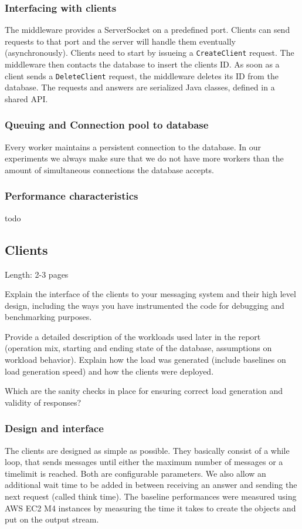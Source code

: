 \documentclass[11pt]{article}
\begin{document}
\subsubsection{Interfacing with clients}\label{sec:interfacing-with-clients}
The middleware provides a ServerSocket on a predefined port. Clients can send requests to that port and the server will handle them eventually (asynchronously).
Clients need to start by issueing a \texttt{CreateClient} request. The middleware then contacts the database to insert the clients ID. As soon as a client sends a \texttt{DeleteClient} request, the middleware deletes its ID from the database.
The requests and answers are serialized Java classes, defined in a shared API.

\subsubsection{Queuing and Connection pool to database}\label{sec:queuing-and-connection-pool-to-database}
Every worker maintains a persistent connection to the database. In our experiments we always make sure that we do not have more workers than the amount of simultaneous connections the database accepts.
\subsubsection{Performance characteristics}\label{sec:performance-characteristics-1}
todo

\subsection{Clients}\label{sec:clients}

Length: 2-3 pages

Explain the interface of the clients to your messaging system and their
high level design, including the ways you have instrumented the code for
debugging and benchmarking purposes.

Provide a detailed description of the workloads used later in the report
(operation mix, starting and ending state of the database, assumptions
on workload behavior). Explain how the load was generated (include
baselines on load generation speed) and how the clients were deployed.

Which are the sanity checks in place for ensuring correct load
generation and validity of responses?

\subsubsection{Design and interface}\label{sec:design-and-interface}
The clients are designed as simple as possible. They basically consist of a while loop, that sends messages until either the maximum number of messages or a timelimit is reached. Both are configurable parameters.
We also allow an additional wait time to be added in between receiving an answer and sending the next request (called think time).
The baseline performances were measured using AWS EC2 M4 instances by measuring the time it takes to create the objects and put on the output stream.
\end{document}
